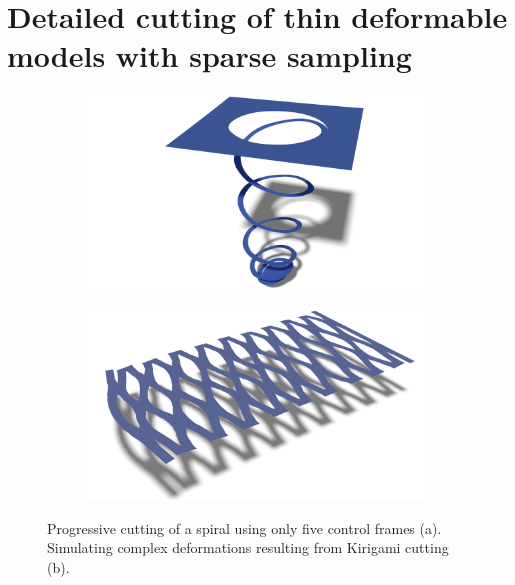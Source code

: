\chapter{Detailed cutting of thin deformable models with sparse sampling}
\label{chap:cutting}

\begin{figure}[t]
\centering
\begin{subfigure}[b]{0.45\linewidth}
\includegraphics[width=\linewidth]{images/cutting-mig2015/Spiral2.pdf}
\caption{\label{fig:spiral}}
\end{subfigure}
\hfill
\begin{subfigure}[b]{0.45\linewidth}
\includegraphics[width=\linewidth]{images/cutting-mig2015/Kirigami.pdf}
\caption{\label{fig:kirigami}}
\end{subfigure}
\caption[Frame-based cutting: Spiral and Kirigami cutting examples]{\label{fig:Cutting_Teaser} Progressive cutting of a spiral using only five control frames (a). Simulating complex deformations resulting from Kirigami cutting (b).}
\end{figure}

